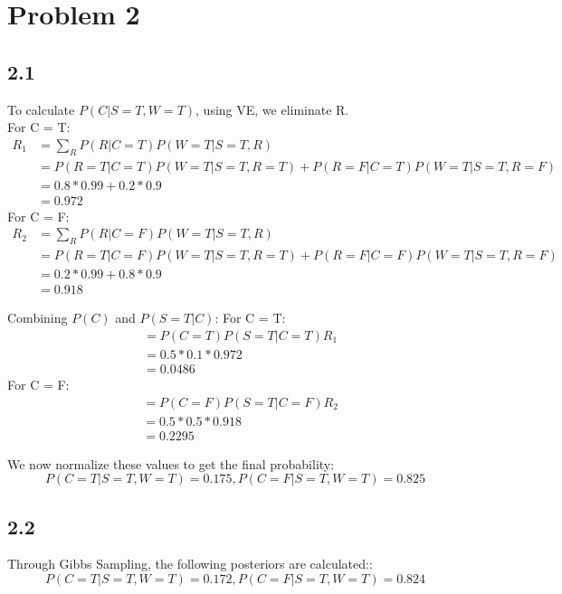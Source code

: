 \documentclass{article}
\begin{document}
\section{Problem 2}

\subsection*{2.1}
To calculate $P(C | S = T, W = T)$, using VE, we eliminate R.\\
For C = T:
\begin{align*}
    R_1 &= \sum_{R}^{}P(R|C = T)P(W = T | S=T, R)\\
    &= P(R = T | C = T)P(W = T | S = T, R = T) + P(R = F | C = T)P(W = T | S = T, R = F)\\
    &= 0.8*0.99 + 0.2*0.9\\
    &= 0.972
\end{align*}
For C = F:
\begin{align*}
    R_2 &= \sum_{R}^{}P(R|C = F)P(W = T | S=T, R)\\
    &= P(R = T | C = F)P(W = T | S = T, R = T) + P(R = F | C = F)P(W = T | S = T, R = F)\\
    &= 0.2*0.99 + 0.8*0.9\\
    &= 0.918
\end{align*}

Combining $P(C)$ and $P(S = T | C)$:
For C = T:
\begin{align*}
    &= P(C = T)P(S = T | C = T)R_1\\
    &= 0.5*0.1*0.972\\
    &= 0.0486
\end{align*}
For C = F:
\begin{align*}
    &= P(C = F)P(S = T | C = F)R_2\\
    &= 0.5*0.5*0.918\\
    &= 0.2295
\end{align*}

We now normalize these values to get the final probability:
$$
P(C = T | S = T, W = T) = 0.175, P(C = F | S = T, W = T) = 0.825
$$

\subsection*{2.2}
Through Gibbs Sampling, the following posteriors are calculated::
$$
P(C = T | S = T, W = T) = 0.172, P(C = F | S = T, W = T) = 0.824
$$
\end{document}
